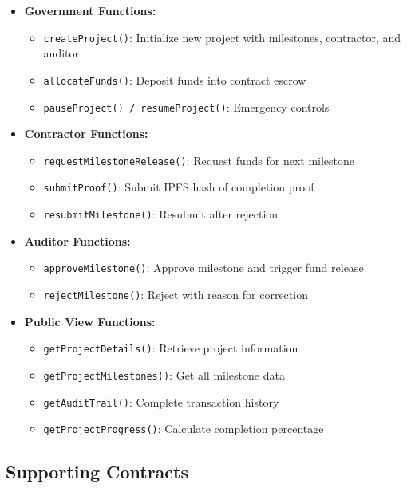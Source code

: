 \documentclass[12pt,a4wide]{report}
\theoremstyle{plain}
\theoremstyle{definition}
\theoremstyle{remark}
\begin{document}
\begin{itemize}
    \item \textbf{Government Functions:}
    \begin{itemize}
        \item \texttt{createProject()}: Initialize new project with milestones, contractor, and auditor
        \item \texttt{allocateFunds()}: Deposit funds into contract escrow
        \item \texttt{pauseProject() / resumeProject()}: Emergency controls
    \end{itemize}
    
    \item \textbf{Contractor Functions:}
    \begin{itemize}
        \item \texttt{requestMilestoneRelease()}: Request funds for next milestone
        \item \texttt{submitProof()}: Submit IPFS hash of completion proof
        \item \texttt{resubmitMilestone()}: Resubmit after rejection
    \end{itemize}
    
    \item \textbf{Auditor Functions:}
    \begin{itemize}
        \item \texttt{approveMilestone()}: Approve milestone and trigger fund release
        \item \texttt{rejectMilestone()}: Reject with reason for correction
    \end{itemize}
    
    \item \textbf{Public View Functions:}
    \begin{itemize}
        \item \texttt{getProjectDetails()}: Retrieve project information
        \item \texttt{getProjectMilestones()}: Get all milestone data
        \item \texttt{getAuditTrail()}: Complete transaction history
        \item \texttt{getProjectProgress()}: Calculate completion percentage
    \end{itemize}
\end{itemize}

\subsection{Supporting Contracts}
\end{document}

